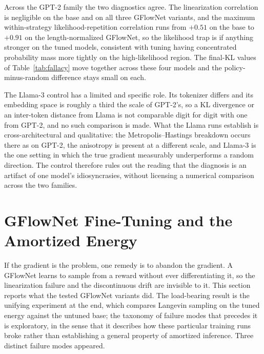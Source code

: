 Across the GPT-2 family the two diagnostics agree. The linearization correlation is negligible on the base and on all three GFlowNet variants, and the maximum within-strategy likelihood-repetition correlation runs from $+0.51$ on the base to $+0.91$ on the length-normalized GFlowNet, so the likelihood trap is if anything stronger on the tuned models, consistent with tuning having concentrated probability mass more tightly on the high-likelihood region. The final-KL values of Table~\ref{tab:fallacy} move together across these four models and the policy-minus-random difference stays small on each.

The Llama-3 control has a limited and specific role. Its tokenizer differs and its embedding space is roughly a third the scale of GPT-2's, so a KL divergence or an inter-token distance from Llama is not comparable digit for digit with one from GPT-2, and no such comparison is made. What the Llama runs establish is cross-architectural and qualitative: the Metropolis--Hastings breakdown occurs there as on GPT-2, the anisotropy is present at a different scale, and Llama-3 is the one setting in which the true gradient measurably underperforms a random direction. The control therefore rules out the reading that the diagnosis is an artifact of one model's idiosyncrasies, without licensing a numerical comparison across the two families.

\section{GFlowNet Fine-Tuning and the Amortized Energy}
\label{sec:results-gfn}

If the gradient is the problem, one remedy is to abandon the gradient. A GFlowNet \citep{bengio2021flow, hu2024amortizing} learns to sample from a reward without ever differentiating it, so the linearization failure and the discontinuous drift are invisible to it. This section reports what the tested GFlowNet variants did. The load-bearing result is the unifying experiment at the end, which compares Langevin sampling on the tuned energy against the untuned base; the taxonomy of failure modes that precedes it is exploratory, in the sense that it describes how these particular training runs broke rather than establishing a general property of amortized inference. Three distinct failure modes appeared.

